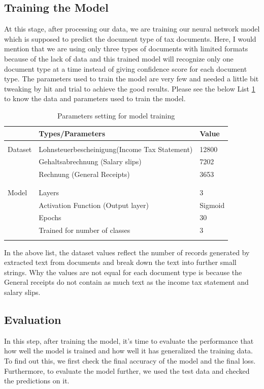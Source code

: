 \subsection{Training the Model}
At this stage, after processing our data, we are training our neural network model which is supposed to predict the document type of tax documents. Here, I would mention that we are using only three types of documents with limited formats because of the lack of data and this trained model will recognize only one document type at a time instead of giving confidence score for each document type. The parameters used to train the model are very few and needed a little bit tweaking by hit and trial to achieve the good results. Please see the below List \ref{hp_md_sol2} to know the data and parameters used to train the model.
\begin{table}[H]
\centering
\begin{tabular}{l  l  l}
 & Types/Parameters & Value \\
\hline
\\ Dataset & Lohnsteuerbescheinigung(Income Tax Statement) & 12800 \\
      & Gehaltsabrechnung (Salary slips) & 7202 \\
      & Rechnung (General Receipts) & 3653  \\\\
      
\hline
\\ Model & Layers & 3 \\
    & Activation Function (Output layer) & Sigmoid \\
    & Epochs & 30 \\
    & Trained for number of classes & 3 \\\\
\end{tabular}
\caption{Parameters setting for model training}
\label{hp_md_sol2}
\end{table}
\par
In the above list, the dataset values reflect the number of records generated by extracted text from documents and break down the text into further small strings. Why the values are not equal for each document type is because the General receipts do not contain as much text as the income tax statement and salary slips.
\subsection{Evaluation}
In this step, after training the model, it's time to evaluate the performance that how well the model is trained and how well it has generalized the training data. To find out this, we first check the final accuracy of the model and the final loss. Furthermore, to evaluate the model further, we used the test data and checked the predictions on it.
